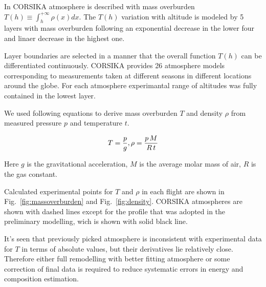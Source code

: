 \documentclass[final,5p,times,twocolumn]{elsarticle}
\begin{document}
In CORSIKA atmosphere is described with mass overburden $T(h) \equiv \int_{h}^{+\infty} \rho(x) dx$. The $T(h)$ variation with altitude is modeled by 5 layers with mass overburden following an exponential decrease in the lower four and linaer decrease in the highest one.


Layer boundaries are selected in a manner that the overall function $T(h)$ can be differentiated continuously. CORSIKA provides 26 atmosphere models corresponding to measurements taken at different seasons in different locations around the globe. For each atmosphere experimantal range of altitudes was fully contained in the lowest layer.

We used following equations to derive mass overburden $T$ and density $\rho$ from measured pressure $p$ and temperature $t$.

\begin{equation}
T     = \frac{p}{g}, \\
\rho  = \frac{p \, M}{R \, t} \\
\end{equation}

Here $g$ is the gravitational acceleration, $M$ is the average molar mass of air, $R$ is the gas constant.

Calculated experimental points for $T$ and $\rho$ in each flight are shown in Fig.~\ref{fig:massoverburden} and Fig.~\ref{fig:density}. CORSIKA atmospheres are shown with dashed lines except for the profile that was adopted in the preliminary modelling, wich is shown with solid black line.

It's seen that previously picked atmosphere is inconsistent with experimental data for $T$ in terms of absolute values, but their derivatives lie relatively close. Therefore either full remodelling with better fitting atmosphere or some correction of final data is required to reduce systematic errors in energy and composition estimation.


\end{document}
